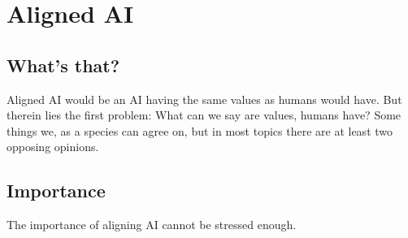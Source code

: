 \chapter{Aligned AI}

\section{What's that?}{
Aligned AI would be an AI having the same values as humans would have. But therein lies the first problem: What can we say are values, humans have? Some things we, as a species can agree on, but in most topics there are at least two opposing opinions.
}
\section{Importance}{
The importance of aligning AI cannot be stressed enough. 
}